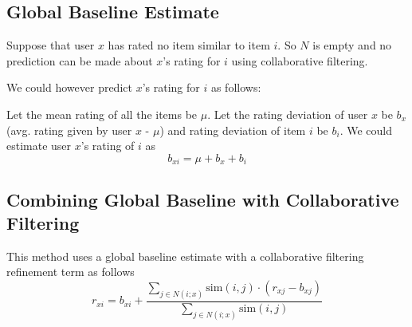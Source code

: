 \documentclass{article}
\newcommand{\Sim}{\text{sim}}
\begin{document}
\subsection{Global Baseline Estimate}
Suppose that user $x$ has rated no item similar to item $i$. So $N$ is empty and no prediction can be made about $x$'s rating for $i$ using collaborative filtering.

We could however predict $x$'s rating for $i$ as follows: 

Let the mean rating of all the items be $\mu$. Let the rating deviation of user $x$ be $b_x$ (avg. rating given by user $x$ - $\mu$) and rating deviation of item $i$ be $b_i$. We could estimate user $x$'s rating of $i$ as 
$$b_{xi} = \mu + b_x + b_i$$

\subsection{Combining Global Baseline with Collaborative Filtering}
This method uses a global baseline estimate with a collaborative filtering refinement term as follows
$$r_{xi} = b_{xi} + \frac{\sum_{j\in N(i;x)} \Sim(i,j) \cdot (r_{xj} - b_{xj})}{\sum_{j\in N(i;x)} \Sim(i,j)}$$
\end{document}
